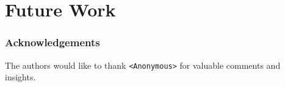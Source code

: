 \documentclass[letterpaper]{article}
\begin{document}
\section{Future Work}
\newpage
\subsubsection*{Acknowledgements}
The authors would like to thank \texttt{<Anonymous>} for valuable comments and insights. 



\end{document}

